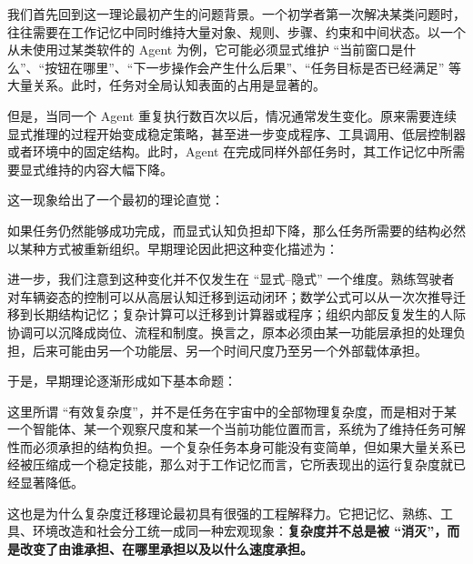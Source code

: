 我们首先回到这一理论最初产生的问题背景。一个初学者第一次解决某类问题时，往往需要在工作记忆中同时维持大量对象、规则、步骤、约束和中间状态。以一个从未使用过某类软件的 Agent 为例，它可能必须显式维护 ``当前窗口是什么''、``按钮在哪里''、``下一步操作会产生什么后果''、``任务目标是否已经满足'' 等大量关系。此时，任务对全局认知表面的占用是显著的。

但是，当同一个 Agent 重复执行数百次以后，情况通常发生变化。原来需要连续显式推理的过程开始变成稳定策略，甚至进一步变成程序、工具调用、低层控制器或者环境中的固定结构。此时，Agent 在完成同样外部任务时，其工作记忆中所需要显式维持的内容大幅下降。

这一现象给出了一个最初的理论直觉：

\begin{statementbox}
\centering
{}
\end{statementbox}

如果任务仍然能够成功完成，而显式认知负担却下降，那么任务所需要的结构必然以某种方式被重新组织。早期理论因此把这种变化描述为：

\begin{statementbox}
\centering
{}
\end{statementbox}

进一步，我们注意到这种变化并不仅发生在 ``显式--隐式'' 一个维度。熟练驾驶者对车辆姿态的控制可以从高层认知迁移到运动闭环；数学公式可以从一次次推导迁移到长期结构记忆；复杂计算可以迁移到计算器或程序；组织内部反复发生的人际协调可以沉降成岗位、流程和制度。换言之，原本必须由某一功能层承担的处理负担，后来可能由另一个功能层、另一个时间尺度乃至另一个外部载体承担。

于是，早期理论逐渐形成如下基本命题：

\begin{statementbox}
\centering
{}
\end{statementbox}

这里所谓 ``有效复杂度''，并不是任务在宇宙中的全部物理复杂度，而是相对于某一个智能体、某一个观察尺度和某一个当前功能位置而言，系统为了维持任务可解性而必须承担的结构负担。一个复杂任务本身可能没有变简单，但如果大量关系已经被压缩成一个稳定技能，那么对于工作记忆而言，它所表现出的运行复杂度就已经显著降低。

这也是为什么复杂度迁移理论最初具有很强的工程解释力。它把记忆、熟练、工具、环境改造和社会分工统一成同一种宏观现象：\textbf{复杂度并不总是被 ``消灭''，而是改变了由谁承担、在哪里承担以及以什么速度承担。}

